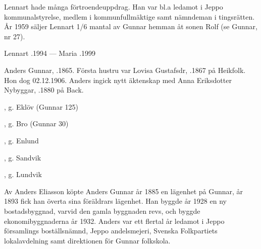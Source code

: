 Lennart hade många förtroendeuppdrag. Han var bl.a ledamot i Jeppo kommunalstyrelse, medlem i kommunfullmäktige samt nämndeman i tingsrätten. År 1959 säljer Lennart 1/6 mantal av Gunnar hemman åt sonen Rolf (se Gunnar, nr 27).

Lennart .1994  ---  Maria .1999





Anders Gunnar, .1865. Första hustru var Lovisa Gustafsdr, .1867 på Heikfolk. Hon dog 02.12.1906. Anders ingick nytt äktenskap med Anna Eriksdotter Nybyggar, .1880 på Back.
\begin{jhchildren}
  \item {}
  \item {}
  \item {}, g. Eklöv (Gunnar 125)
  \item {}, g. Bro (Gunnar 30)
  \item {}, g. Enlund
  \item {}
  \item {}, g. Sandvik
  \item {}, g. Lundvik
  \item {}
  \item {}
  \item {}
\end{jhchildren}

Av Anders Eliasson köpte Anders Gunnar år 1885 en lägenhet på Gunnar, år 1893 fick han överta sina föräldrars lägenhet. Han byggde år 1928 en ny bostadsbyggnad, varvid den gamla byggnaden revs, och byggde ekonomibyggnaderna år 1932.	Anders var ett flertal år ledamot i Jeppo församlings boställsnämnd, Jeppo andelsmejeri, Svenska Folkpartiets lokalavdelning samt direktionen för Gunnar folkskola.

